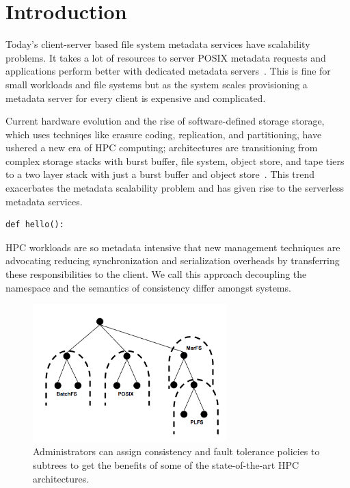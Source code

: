 \section{Introduction}

Today's client-server based file system metadata services have scalability
problems. It takes a lot of resources to server POSIX metadata requests and
applications perform better with dedicated metadata
servers~\cite{sevilla:sc15-mantle, ren:sc2014-indexfs}. This is fine for small
workloads and file systems but as the system scales provisioning a metadata
server for every client is expensive and complicated.

Current hardware evolution and the rise of software-defined storage storage,
which uses techniqes like erasure coding, replication, and partitioning, have
ushered a new era of HPC computing; architectures are transitioning from
complex storage stacks with burst buffer, file system, object store, and tape
tiers to a two layer stack with just a burst buffer and object
store~\cite{bent:login16-hpc-trends}. This trend exacerbates the metadata
scalability problem and has given rise to the serverless metadata services.
\begin{verbatim}
def hello():
\end{verbatim}

HPC workloads are so metadata intensive that new management techniques are
advocating reducing synchronization and serialization overheads by transferring
these responsibilities to the client. We call this approach decoupling the
namespace and the semantics of consistency differ amongst systems.

\begin{figure}[tb]
\centering
\includegraphics[width=75mm]{figures/subtree-policies.png}
\caption{Administrators can assign consistency and fault tolerance policies to
subtrees to get the benefits of some of the state-of-the-art HPC architectures.
}\label{fig:subtree-policies}
\end{figure}

